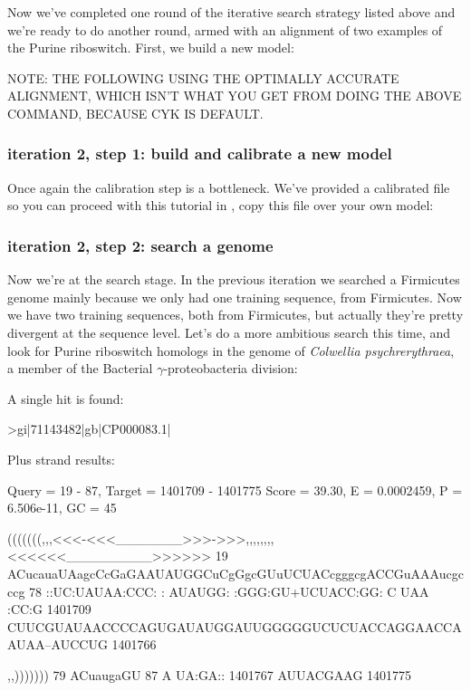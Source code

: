 
Now we've completed one round of the iterative search strategy listed
above and we're ready to do another round, armed with an alignment of
two examples of the Purine riboswitch. First, we build a new model:

NOTE: THE FOLLOWING USING THE OPTIMALLY ACCURATE ALIGNMENT, WHICH
ISN'T WHAT YOU GET FROM DOING THE ABOVE COMMAND, BECAUSE CYK IS DEFAULT.

\subsubsection{iteration 2, step 1: build and calibrate a new model}

Once again the calibration step is a bottleneck. We've provided a
calibrated file so you can proceed with this tutorial in
, copy this file over your own model:


\subsubsection{iteration 2, step 2: search a genome}

Now we're at the search stage. In the previous iteration we searched a
Firmicutes genome mainly because we only had one training sequence, from
Firmicutes. Now we have two training sequences, both from Firmicutes,
but actually they're pretty divergent at the sequence level. Let's do a
more ambitious search this time, and look for Purine riboswitch
homologs in the genome of \emph{Colwellia psychrerythraea}, a member of the
Bacterial $\gamma$-proteobacteria division:


A single hit is found:

{\samepage
\begin{sreoutput}
>gi|71143482|gb|CP000083.1|

  Plus strand results:

 Query = 19 - 87, Target = 1401709 - 1401775
 Score = 39.30, E = 0.0002459, P = 6.506e-11, GC =  45

           (((((((,,,<<<-<<<_______>>>->>>,,,,,,,,<<<<<<_________>>>>>>
        19 ACucauaUAagcCcGaGAAUAUGGCuCgGgcGUuUCUACcgggcgACCGuAAAucgcccg 78      
           ::UC:UAUAA:CCC: : AUAUGG: :GGG:GU+UCUACC:GG:  C  UAA   :CC:G
   1401709 CUUCGUAUAACCCCAGUGAUAUGGAUUGGGGGUCUCUACCAGGAACCAAUAA--AUCCUG 1401766 

           ,,)))))))
        79 ACuaugaGU 87      
           A UA:GA::
   1401767 AUUACGAAG 1401775 
\end{sreoutput}
}

